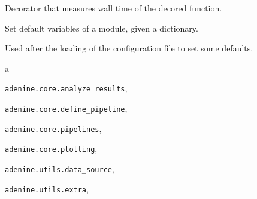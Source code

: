 \documentclass[letterpaper,10pt,english]{sphinxmanual}
\begin{document}

\begin{fulllineitems}
\label{index:adenine.utils.extra.timed}
Decorator that measures wall time of the decored function.

\end{fulllineitems}


\begin{fulllineitems}
\label{index:adenine.utils.extra.set_module_defaults}
Set default variables of a module, given a dictionary.

Used after the loading of the configuration file to set some defaults.

\end{fulllineitems}



\renewcommand{\indexname}{Python Module Index}
\begin{theindex}
\def\bigletter#1{{\Large\sffamily#1}\nopagebreak\vspace{1mm}}
\bigletter{a}
\item {\texttt{adenine.core.analyze\_results}}, \pageref{index:module-adenine.core.analyze_results}
\item {\texttt{adenine.core.define\_pipeline}}, \pageref{index:module-adenine.core.define_pipeline}
\item {\texttt{adenine.core.pipelines}}, \pageref{index:module-adenine.core.pipelines}
\item {\texttt{adenine.core.plotting}}, \pageref{index:module-adenine.core.plotting}
\item {\texttt{adenine.utils.data\_source}}, \pageref{index:module-adenine.utils.data_source}
\item {\texttt{adenine.utils.extra}}, \pageref{index:module-adenine.utils.extra}
\end{theindex}

\renewcommand{\indexname}{Index}
\printindex
\end{document}
